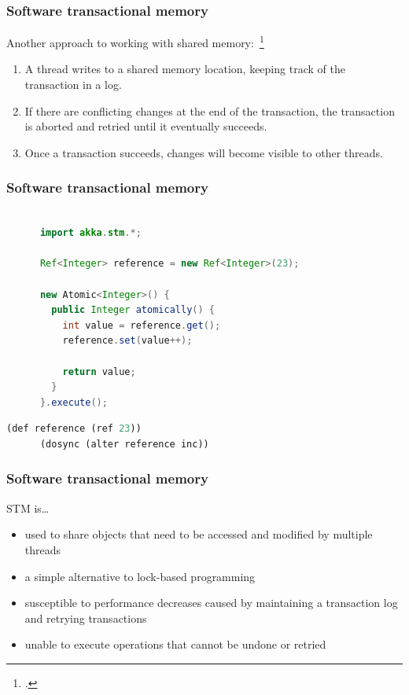 \documentclass{beamer}
\begin{document}
  \begin{frame}
    \frametitle{Software transactional memory}

    Another approach to working with shared memory:~\footcite{Shavit1995}

    \begin{enumerate}
      \item A thread writes to a shared memory location, keeping track of the transaction in a log.
      \item If there are conflicting changes at the end of the transaction, the transaction is aborted and retried until it eventually succeeds.
      \item Once a transaction succeeds, changes will become visible to other threads.
    \end{enumerate}
  \end{frame}

  \begin{frame}[fragile]
    \frametitle{Software transactional memory}

    \begin{lstlisting}[basicstyle=\scriptsize\ttfamily,language=Java]

      import akka.stm.*;

      Ref<Integer> reference = new Ref<Integer>(23);

      new Atomic<Integer>() {
        public Integer atomically() {
          int value = reference.get();
          reference.set(value++);

          return value;
        }
      }.execute();
    \end{lstlisting}

    \vfill

    \begin{lstlisting}[basicstyle=\scriptsize\ttfamily,language=Lisp]
      (def reference (ref 23))
      (dosync (alter reference inc))
    \end{lstlisting}
\end{frame}

  \begin{frame}
    \frametitle{Software transactional memory}

    STM is\ldots

    \begin{itemize}
      \item used to share objects that need to be accessed and modified by multiple threads
      \item a simple alternative to lock-based programming
      \item susceptible to performance decreases caused by maintaining a transaction log and retrying transactions
      \item unable to execute operations that cannot be undone or retried
    \end{itemize}
  \end{frame}
\end{document}
